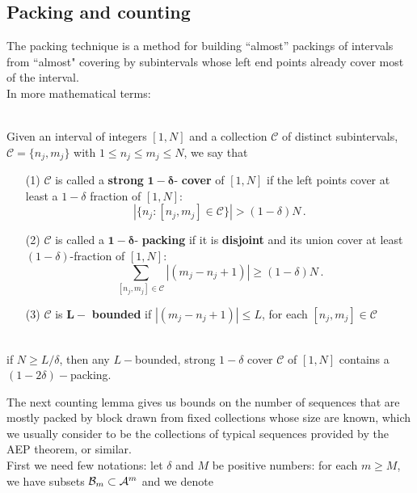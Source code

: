 \subsection{Packing and counting}
The packing technique is a method for building ``almost'' packings of intervals from ``almost" covering by subintervals whose left end points already cover most of the interval. 
\\In more mathematical terms: 
\begin{definition}
    \hfill
    \\Given an interval of integers $[1, N]$ and a collection $\mathcal{C}$ of distinct subintervals, $\mathcal{C}= \{ n_j, m_j \}$ with $1 \leq n_j \leq m_j \leq N$, we say that
    \begin{itemize}
        \item[(1)] $\mathcal{C}$ is called a \textbf{strong} $\bm{1 - \delta}$- \textbf{cover} of $[1, N]$ if the left points cover at least a $1- \delta$ fraction of $[1, N]$:
        \begin{equation*}
            |\{ n_j : [n_j, m_j] \in \mathcal{C} \}| > (1 - \delta)N \,.
        \end{equation*}
        \item[(2)] $\mathcal{C}$ is called a $\bm{1 - \delta}$- \textbf{packing} if it is \textbf{disjoint} and its union cover at least $(1 - \delta)$-fraction of $[1,N]$:
        \begin{equation*}
            \sum_{[n_j, m_j] \in \mathcal{C}} |(m_j - n_j + 1)| \geq (1 - \delta)N \, .
        \end{equation*}
        \item[(3)] $\mathcal{C}$ is $\bm{L-}$ \textbf{bounded}  if $|(m_j - n_j +1 )| \leq L$, for each $[n_j, m_j] \in \mathcal{C}$
    \end{itemize}
\end{definition}
\begin{lemma}
\hfill\\
    if $N \geq L/\delta$, then any $L-$bounded, strong $1-\delta$ cover $\mathcal{C}$ of $[1,N]$ contains a $(1- 2\delta)-$packing.
\end{lemma}
The next counting lemma gives us bounds on the number of sequences that are mostly packed by block drawn from fixed collections whose size are known, which we usually consider to be the collections of typical sequences provided by the AEP theorem, or similar.
\\First we need few notations: let $\delta$ and $M$ be positive numbers: for each $m \geq M$, we have subsets $\mathcal{B}_m \subset \mathcal{A}^m$ and we denote 
